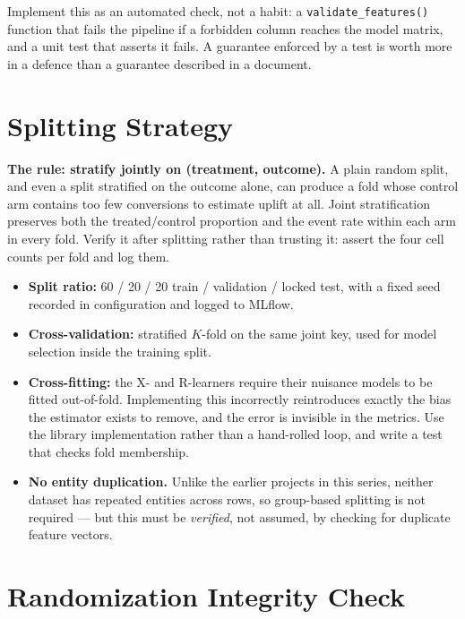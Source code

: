 \documentclass[11pt,a4paper]{article}
\begin{document}
\begin{goodbox}
Implement this as an automated check, not a habit: a \texttt{validate\_features()} function that
fails the pipeline if a forbidden column reaches the model matrix, and a unit test that asserts it
fails. A guarantee enforced by a test is worth more in a defence than a guarantee described in a
document.
\end{goodbox}

\section{Splitting Strategy}
\label{sec:splitting}

\begin{keybox}
\textbf{The rule: stratify jointly on (treatment, outcome).} A plain random split, and even a split
stratified on the outcome alone, can produce a fold whose control arm contains too few conversions
to estimate uplift at all. Joint stratification preserves both the treated/control proportion and
the event rate within each arm in every fold. Verify it after splitting rather than trusting it:
assert the four cell counts per fold and log them.
\end{keybox}

\begin{itemize}
\item \textbf{Split ratio:} 60 / 20 / 20 train / validation / locked test, with a fixed seed
recorded in configuration and logged to MLflow.
\item \textbf{Cross-validation:} stratified $K$-fold on the same joint key, used for model selection
inside the training split.
\item \textbf{Cross-fitting:} the X- and R-learners require their nuisance models to be fitted
out-of-fold. Implementing this incorrectly reintroduces exactly the bias the estimator exists to
remove, and the error is invisible in the metrics. Use the library implementation rather than a
hand-rolled loop, and write a test that checks fold membership.
\item \textbf{No entity duplication.} Unlike the earlier projects in this series, neither dataset
has repeated entities across rows, so group-based splitting is not required --- but this must be
\emph{verified}, not assumed, by checking for duplicate feature vectors.
\end{itemize}

\section{Randomization Integrity Check}
\label{sec:balance}
\end{document}
